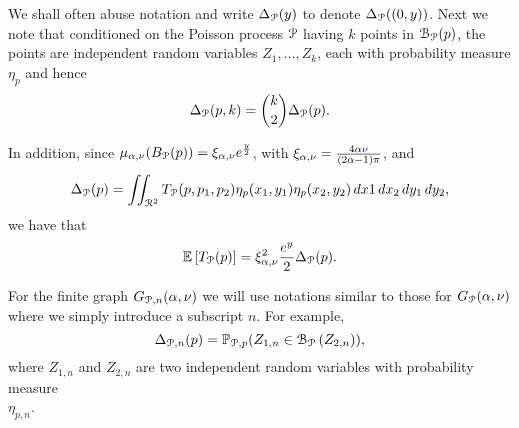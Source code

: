 We shall often abuse notation and write $\Delta_{{\mathcal P}}(y)$ to denote $\Delta_{{\mathcal P}}((0,y))$. %
Next we note that conditioned on the Poisson process ${\mathcal P}$ having $k$ points in $\mathcal{B}_{{\mathcal P}}(p)$, the points are independent random variables $Z_{1}, \dots, Z_{k}$, each with probability measure $\eta_{p}$ and hence
\[
	\Delta_{{\mathcal P}}(p,k) = \binom{k}{2} \Delta_{{\mathcal P}}(p).
\]

In addition, since $\mu_{\alpha, \nu}(B_{{\mathcal P}}(p)) = \xi_{\alpha,\nu} e^{\frac{y}{2}}$, with $\xi_{\alpha,\nu} = \frac{4\alpha{{\color{blue} \nu}}}{(2\alpha - 1)\pi}$, and
\[
	\Delta_{{\mathcal P}}(p) = \iint_{{\mathcal R}^2} T_{{\mathcal P}}(p,p_1,p_2) \eta_{p}(x_1,y_1)\eta_{p}(x_2,y_2) \, dx1 \, dx_2 \, dy_1 \, dy_2,
\]
we have that
\begin{equation}\label{eq:relation_T_vs_Delta_P}
	\mathbb{E}\left[T_{{\mathcal P}}(p)\right] = \xi_{\alpha,\nu}^2 \frac{e^{y}}{2} \Delta_{{\mathcal P}}(p).
\end{equation}

\begin{remark}\label{rmk:notations_clustering_P_n}
For the finite graph $G_{{\mathcal P},n}(\alpha, \nu)$ we will use notations similar to those for $G_{{\mathcal P}}(\alpha, \nu)$ where we simply introduce a subscript $n$. For example, 
\[
	\Delta_{{\mathcal P},n}(p) = \mathbb{P}_{\mathcal{P},p}( Z_{1,n} \in {\mathcal B}_{{\mathcal P}}\left(Z_{2,n}\right)),
\]
where $Z_{1,n}$ and $Z_{2,n}$ are two independent random variables with probability measure \\
$\eta_{p,n}$.
\end{remark}

